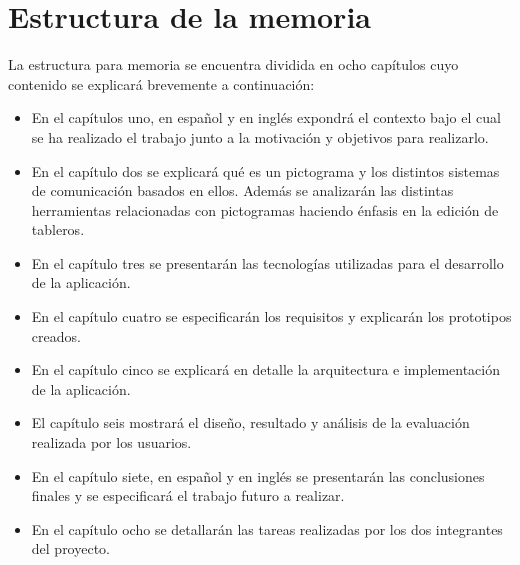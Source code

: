 \section{Estructura de la memoria}
\label{cap1:sec:Estructura}

La estructura para memoria se encuentra dividida en ocho capítulos cuyo contenido se explicará brevemente a continuación: 
\begin{itemize}
	\item En el capítulos uno, en español y en inglés expondrá el contexto bajo el cual se ha realizado el trabajo junto a la motivación y objetivos para realizarlo.
	
	\item En el capítulo dos se explicará qué es un pictograma y los distintos sistemas de comunicación basados en ellos. Además se analizarán las distintas herramientas relacionadas con pictogramas haciendo énfasis en la edición de tableros.
	
	\item En el capítulo tres se presentarán las tecnologías utilizadas para el desarrollo de la aplicación.
	
	\item En el capítulo cuatro se especificarán los requisitos y explicarán los prototipos creados.
	
	\item En el capítulo cinco se explicará en detalle la arquitectura e implementación de la aplicación.
	
	\item El capítulo seis mostrará el diseño, resultado y análisis de la evaluación realizada por los usuarios. 
	
	\item En el capítulo siete, en español y en inglés se presentarán las conclusiones finales y se especificará el trabajo futuro a realizar.
	
	\item En el capítulo ocho se detallarán las tareas realizadas por los dos integrantes del proyecto.
\end{itemize}	





